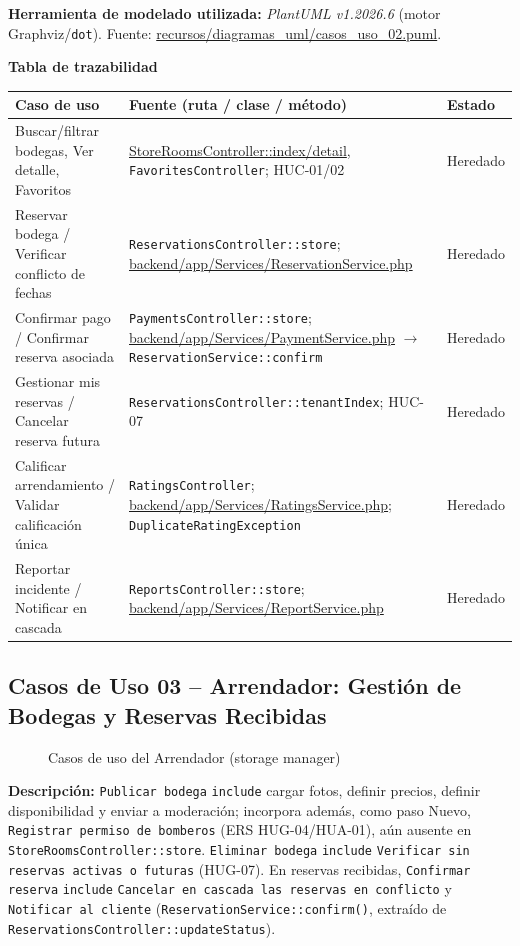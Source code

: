 \bigskip
{\sloppy\noindent\textbf{Herramienta de modelado utilizada:} \textit{PlantUML v1.2026.6} (motor Graphviz/\texttt{dot}). Fuente: \url{recursos/diagramas_uml/casos_uso_02.puml}.\par}

\bigskip
\noindent\textbf{Tabla de trazabilidad}
\begin{longtable}{|L{5cm}|L{7.5cm}|M{2cm}|}
\hline
{} \textbf{Caso de uso} & \textbf{Fuente (ruta / clase / método)} & \textbf{Estado} \\ \hline
\endhead
Buscar/filtrar bodegas, Ver detalle, Favoritos & \url{StoreRoomsController::index/detail}, \texttt{FavoritesController}; HUC-01/02 & Heredado \\ \hline
Reservar bodega / Verificar conflicto de fechas & \texttt{ReservationsController::store}; \url{backend/app/Services/ReservationService.php} & Heredado \\ \hline
Confirmar pago / Confirmar reserva asociada & \texttt{PaymentsController::store}; \url{backend/app/Services/PaymentService.php} $\rightarrow$ \texttt{ReservationService::confirm} & Heredado \\ \hline
Gestionar mis reservas / Cancelar reserva futura & \texttt{ReservationsController::tenantIndex}; HUC-07 & Heredado \\ \hline
Calificar arrendamiento / Validar calificación única & \texttt{RatingsController}; \url{backend/app/Services/RatingsService.php}; \texttt{DuplicateRatingException} & Heredado \\ \hline
Reportar incidente / Notificar en cascada & \texttt{ReportsController::store}; \url{backend/app/Services/ReportService.php} & Heredado \\ \hline
\end{longtable}
\clearpage

\subsection{Casos de Uso 03 -- Arrendador: Gestión de Bodegas y Reservas Recibidas}
\begin{figure}[H]
    \centering
    \caption{Casos de uso del Arrendador (storage manager)}
    \label{fig:cu03}
\end{figure}
\noindent\textbf{Descripción:} \texttt{Publicar bodega} \texttt{\guillemotleft include\guillemotright} cargar fotos, definir precios, definir disponibilidad y enviar a moderación; incorpora además, como paso Nuevo, \texttt{Registrar permiso de bomberos} (ERS HUG-04/HUA-01), aún ausente en \texttt{StoreRoomsController::store}. \texttt{Eliminar bodega} \texttt{\guillemotleft include\guillemotright} \texttt{Verificar sin reservas activas o futuras} (HUG-07). En reservas recibidas, \texttt{Confirmar reserva} \texttt{\guillemotleft include\guillemotright} \texttt{Cancelar en cascada las reservas en conflicto} y \texttt{Notificar al cliente} (\texttt{ReservationService::confirm()}, extraído de \texttt{ReservationsController::updateStatus}).

